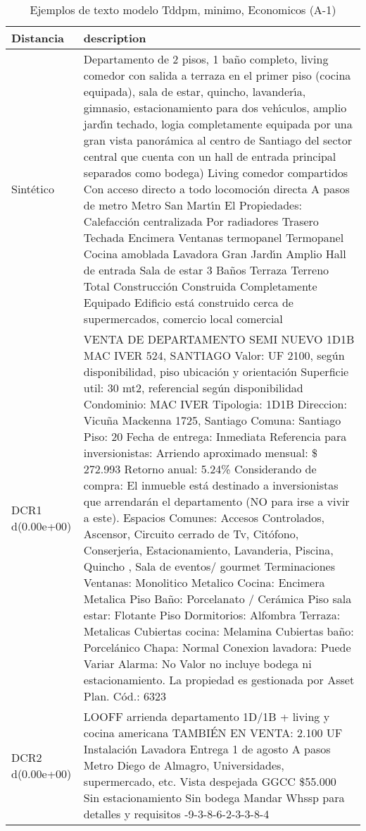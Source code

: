 \begin{table}[H]
\centering
\fontsize{10}{14}\selectfont
\caption{Ejemplos de texto modelo Tddpm, minimo, Economicos (A-1)}
\label{table-example-economicos-a-1-tddpm_mlp-min-text}
\begin{tabular}{|l|m{35em}|}
\hline
\rowcolor[gray]{0.8}
Distancia & description \\
\hline Sintético & Departamento de 2 pisos, 1 ba\~no completo, living comedor con salida a terraza en el primer piso (cocina equipada), sala de estar, quincho, lavander{\'\i}a, gimnasio, estacionamiento para dos veh{\'\i}culos, amplio jard{\'\i}n techado, logia completamente equipada por una gran vista panor\'amica al centro de Santiago del sector central que cuenta con un hall de entrada principal separados como bodega) Living comedor compartidos Con acceso directo a todo locomoci\'on directa A pasos de metro Metro San Mart{\'\i}n El Propiedades: Calefacci\'on centralizada Por radiadores Trasero Techada Encimera Ventanas termopanel Termopanel Cocina amoblada Lavadora Gran Jard{\'\i}n Amplio Hall de entrada Sala de estar 3 Ba\~nos Terraza Terreno Total Construcci\'on Construida Completamente Equipado Edificio est\'a construido cerca de supermercados, comercio local comercial \\
\hline DCR1 d(0.00e+00) & VENTA DE DEPARTAMENTO SEMI NUEVO 1D1B MAC IVER 524, SANTIAGO  Valor: UF 2100, seg\'un disponibilidad, piso ubicaci\'on y orientaci\'on Superficie util: 30 mt2, referencial seg\'un disponibilidad Condominio: MAC IVER Tipologia: 1D1B Direccion: Vicu\~na Mackenna 1725, Santiago Comuna: Santiago Piso: 20 Fecha de entrega: Inmediata  Referencia para inversionistas: Arriendo aproximado mensual: \$ 272.993 Retorno anual: 5.24\%  Considerando de compra: El inmueble est\'a destinado a inversionistas que arrendar\'an el departamento (NO para irse a vivir a este).  Espacios Comunes: Accesos Controlados, Ascensor, Circuito cerrado de Tv, Cit\'ofono, Conserjer{\'\i}a, Estacionamiento, Lavanderia, Piscina, Quincho , Sala de eventos/ gourmet  Terminaciones Ventanas: Monolitico Metalico Cocina: Encimera Metalica Piso Ba\~no: Porcelanato / Cer\'amica Piso sala estar: Flotante Piso Dormitorios: Alfombra Terraza: Metalicas Cubiertas cocina: Melamina Cubiertas ba\~no: Porcel\'anico Chapa: Normal Conexion lavadora: Puede Variar Alarma: No  Valor no incluye bodega ni estacionamiento.  La propiedad es gestionada por Asset Plan.  C\'od.: 6323 \\
\hline DCR2 d(0.00e+00) & LOOFF arrienda departamento 1D/1B + living y cocina americana TAMBI\'EN EN VENTA: 2.100 UF Instalaci\'on Lavadora Entrega 1 de agosto A pasos Metro Diego de Almagro, Universidades, supermercado, etc. Vista despejada GGCC \$55.000 Sin estacionamiento Sin bodega Mandar Whssp para detalles y requisitos -9-3-8-6-2-3-3-8-4 \\
\hline
\end{tabular}
\end{table}
